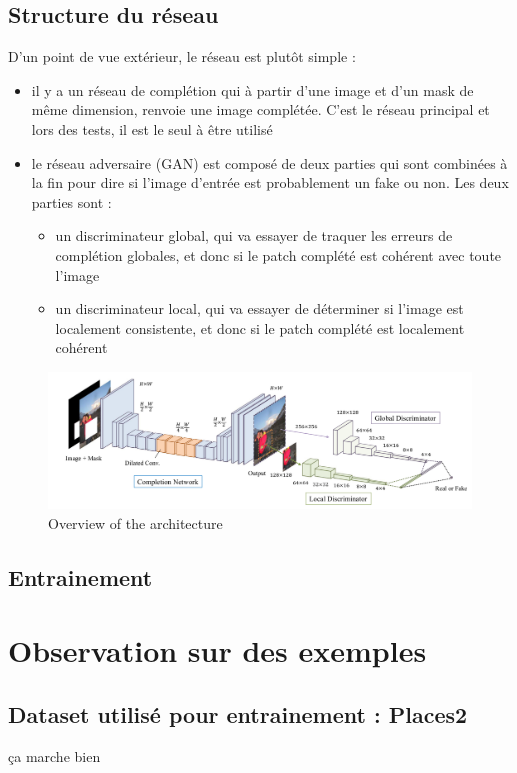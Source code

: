 \documentclass[12pt]{article}
\begin{document}
\subsection{Structure du réseau}
D'un point de vue extérieur, le réseau est plutôt simple : 
\begin{itemize}
    \item il y a un réseau de complétion qui à partir d'une image et d'un mask de même dimension, renvoie une image complétée. C'est le réseau principal et lors des tests, il est le seul à être utilisé
    \item le réseau adversaire (GAN) est composé de deux parties qui sont combinées à la fin pour dire si l'image d'entrée est probablement un fake ou non. Les deux parties sont : 
    \begin{itemize}
        \item un discriminateur global, qui va essayer de traquer les erreurs de complétion globales, et donc si le patch complété est cohérent avec toute l'image
        \item un discriminateur local, qui va essayer de déterminer si l'image est localement consistente, et donc si le patch complété est localement cohérent
    \end{itemize}
\end{itemize}

\begin{figure}[H]
    \includegraphics[width=1.0\textwidth]{network_overview.png}
    \caption{Overview of the architecture}
\end{figure}

\subsection{Entrainement}

\section{Observation sur des exemples}

\subsection{Dataset utilisé pour entrainement : Places2}
ça marche bien
\end{document}
